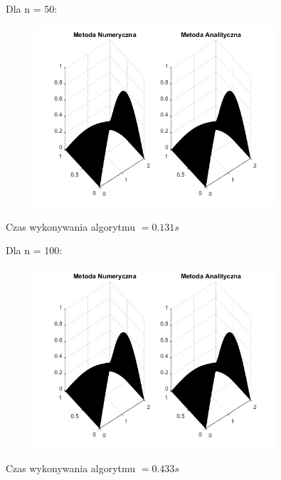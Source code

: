 \newpage

Dla n = 50:

\begin{figure}[!ht]
	\begin{center}
		\includegraphics[width=0.8\textwidth]{Lab7/charts/rmb/50.png}
	\end{center}
\end{figure}

Czas wykonywania algorytmu $ = 0.131s$

Dla n = 100:

\begin{figure}[!ht]
	\begin{center}
		\includegraphics[width=0.8\textwidth]{Lab7/charts/rmb/100.png}
	\end{center}
\end{figure}

Czas wykonywania algorytmu $ = 0.433s$

\newpage

